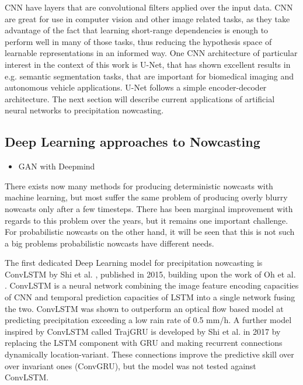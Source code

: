 CNN have layers that are convolutional filters applied over the input data. CNN are great for use in computer vision and other image related tasks, as they take advantage of the fact that learning short-range dependencies is enough to perform well in many of those tasks, thus reducing the hypothesis space of learnable representations in an informed way. One CNN architecture of particular interest in the context of this work is U-Net, that has shown excellent results in e.g. semantic segmentation tasks, that are important for biomedical imaging and autonomous vehicle applications. U-Net follows a simple encoder-decoder architecture. The next section will describe current applications of artificial neural networks to precipitation nowcasting.



\subsection{Deep Learning approaches to Nowcasting}
\begin{itemize}
	\item GAN with Deepmind 
	
\end{itemize}

There exists now many methods for producing deterministic nowcasts with machine learning, but most suffer the same problem of producing overly blurry nowcasts only after a few timesteps. There has been marginal improvement with regards to this problem over the years, but it remains one important challenge. For probabilistic nowcasts on the other hand, it will be seen that this is not such a big problems probabilistic nowcasts have different needs. 
 
The first dedicated Deep Learning model for precipitation nowcasting is ConvLSTM by Shi et al. \cite{shi_convolutional_2015}, published in 2015, building upon the work of Oh et al. \cite{oh_action-conditional_2015}. ConvLSTM is a neural network combining the image feature encoding capacities of CNN and  temporal prediction capacities of LSTM into a single network fusing the two. ConvLSTM was shown to outperform an optical flow based model at predicting precipitation exceeding a low rain rate of 0.5 mm/h. 
A further model inspired by ConvLSTM called TrajGRU is developed by Shi et al. \cite{shi_deep_2017} in 2017 by replacing the LSTM component with GRU and making recurrent connections dynamically location-variant. These connections improve the predictive skill over over invariant ones (ConvGRU), but the model was not tested against ConvLSTM. 

